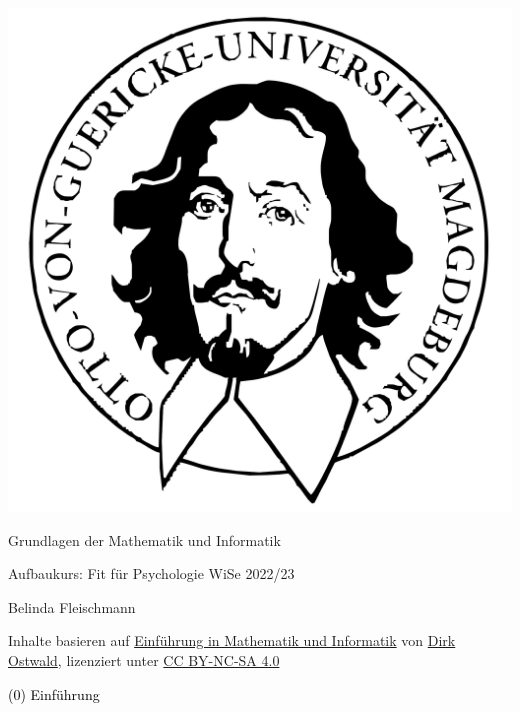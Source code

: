 \documentclass[
  8pt,
  ignorenonframetext,
  t]{beamer}
\author{}
\date{\vspace{-2.5em}}
\begin{document}
\begin{frame}[plain]{}
\protect\hypertarget{section}{}
\center

\begin{center}\includegraphics[width=0.2\linewidth]{../Abbildungen/glmi_otto} \end{center}

\vspace{2mm}

\huge

Grundlagen der Mathematik und Informatik \vspace{6mm}

\Large

Aufbaukurs: Fit für Psychologie WiSe 2022/23

\vspace{12mm}
\normalsize

Belinda Fleischmann

\vspace{3mm}
\scriptsize

Inhalte basieren auf
\href{https://www.ipsy.ovgu.de/Institut/Abteilungen+des+Institutes/Methodenlehre+I+_+Experimentelle+und+Neurowissenschaftliche+Psychologie/Lehre/Wintersemester+2022/Grundlagen+der+Mathematik+und+Informatik.html}{Einführung
in Mathematik und Informatik} von
\href{https://www.ipsy.ovgu.de/Institut/Abteilungen+des+Institutes/Methodenlehre+I+_+Experimentelle+und+Neurowissenschaftliche+Psychologie/Team/Dirk+Ostwald.html}{Dirk
Ostwald}, lizenziert unter
\href{https://creativecommons.org/licenses/by-sa/4.0/deed.de}{CC
BY-NC-SA 4.0}
\end{frame}

\begin{frame}[plain]{}
\protect\hypertarget{section-1}{}
\vfill
\center
\huge

\textcolor{black}{(0) Einführung} \vfill
\end{frame}
\end{document}
